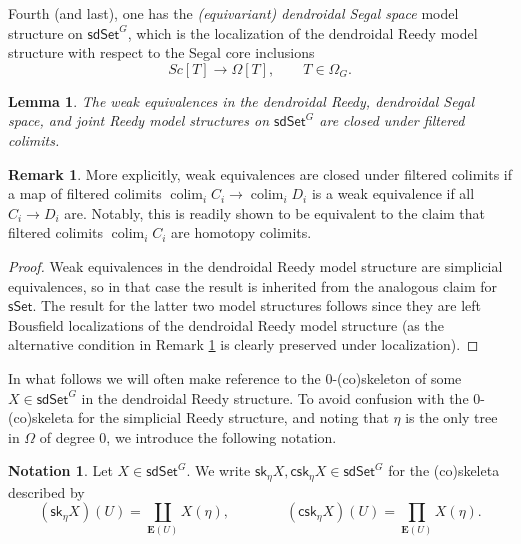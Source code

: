 \documentclass[a4paper,10pt]{article}%
\numberwithin{equation}{section}
\numberwithin{figure}{section}
\newtheorem{lemma}[equation]{Lemma}%
\theoremstyle{definition} %
\newtheorem{remark}[equation]{Remark}%
\newtheorem{notation}[equation]{Notation}%
\newcommand{\longto}{\longrightarrow}%
\DeclareMathOperator{\colim}{colim}%
\newcommand{\1}{\ensuremath{\mathbbm 1}}%
\begin{document}
Fourth (and last), one has the \textit{(equivariant) dendroidal Segal space} model structure on $\mathsf{sdSet}^G$,
which is the localization of the dendroidal Reedy model structure with respect to the Segal core inclusions
\[
	Sc[T] \longto \Omega[T],
\qquad
	T \in \Omega_G.
\]



\begin{lemma}\label{FCOLIM_WE_LEM}
	The weak equivalences in the dendroidal Reedy, dendroidal Segal space, and joint Reedy model structures 
	on $\mathsf{sdSet}^G$ are closed under filtered colimits.
\end{lemma}


\begin{remark}\label{WEFILRES REM}
	More explicitly, weak equivalences are closed
	under filtered colimits if a map of filtered colimits
	$\colim_i C_i \to \colim_i D_i$
	is a weak equivalence if all $C_i \to D_i$ are.
%	
	Notably, this is readily shown to be equivalent to 
	the claim that filtered colimits
	$\colim_i C_i$ are homotopy colimits.
\end{remark}


\begin{proof}
	Weak equivalences in the dendroidal Reedy model structure are simplicial equivalences, 
	so in that case the result is inherited from the analogous claim for $\mathsf{sSet}$.
%	
	The result for the latter two model structures follows
	since they are left Bousfield localizations of the dendroidal Reedy model structure
	(as the alternative condition in
	Remark \ref{WEFILRES REM}
	is clearly preserved under localization).
\end{proof}




In what follows we will often make reference
to the $0$-(co)skeleton
of some $X \in \mathsf{sdSet}^G$
in the dendroidal Reedy structure.
To avoid confusion with the
$0$-(co)skeleta for the simplicial Reedy structure,
and noting that $\eta$ is the only tree in $\Omega$
of degree $0$, we introduce the following notation.




\begin{notation}
Let $X \in \mathsf{sdSet}^G$.
We write
$\mathsf{sk}_{\eta}X,\mathsf{csk}_{\eta}X \in \mathsf{sdSet}^G$
for the (co)skeleta described by
\[
	\left(\mathsf{sk}_{\eta} X\right)(U) =
	\coprod_{\boldsymbol{E}(U)} X(\eta),
\qquad \qquad
	\left(\mathsf{csk}_{\eta} X\right)(U) = 
	\prod_{\boldsymbol{E}(U)} X(\eta).
\]
\end{notation}
\end{document}
